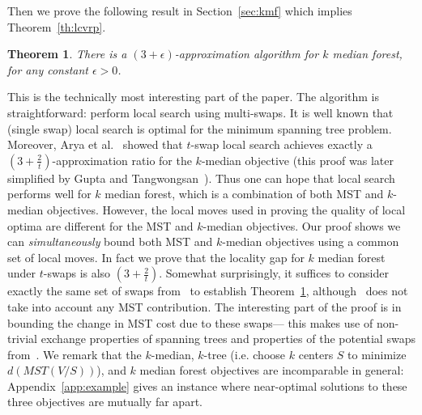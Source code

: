 \documentclass[11pt,twoside,a4paper]{article}
\newtheorem{theorem}{Theorem}
\def\kmf{$k$ median forest\xspace}
\begin{document}
Then we prove the following result in Section~\ref{sec:kmf} which implies Theorem~\ref{th:lcvrp}.
\begin{theorem}\label{th:kmed-forest}
There is a $(3+\epsilon)$-approximation algorithm for $k$ median forest, for any constant $\epsilon>0$.
\end{theorem}
This is the technically most interesting part of the paper. The algorithm is straightforward: perform local search
using multi-swaps. It is well known that (single swap) local search is optimal for the minimum spanning tree problem.
Moreover, Arya et al.~\cite{AGKMMP04} showed that $t$-swap local search achieves exactly a $(3+\frac2t)$-approximation
ratio for the $k$-median objective (this proof was later simplified by Gupta and Tangwongsan~\cite{GT08}). Thus one can
hope that local search performs well for $k$ median forest, which is a combination of both MST and $k$-median
objectives. However, the local moves used in proving the quality of local optima are different for the MST and
$k$-median objectives. Our proof shows we can {\em simultaneously} bound both MST and $k$-median objectives using a
common set of local moves. In fact we prove that the locality gap for \kmf under $t$-swaps is also $(3+\frac2t)$.
Somewhat surprisingly, it suffices to consider exactly the same set of swaps from~\cite{GT08} to establish
Theorem~\ref{th:kmed-forest}, although~\cite{GT08} does not take into account any MST contribution. The interesting
part of the proof is in bounding the change in MST cost due to these swaps--- this makes use of non-trivial exchange
properties of spanning trees and properties of the potential swaps from~\cite{GT08}. We remark that the $k$-median,
$k$-tree (i.e. choose $k$ centers $S$ to minimize $d(MST(V/S))$), and \kmf objectives are incomparable in general:
Appendix~\ref{app:example} gives an instance where near-optimal solutions to these three objectives are mutually far
apart.
\end{document}
